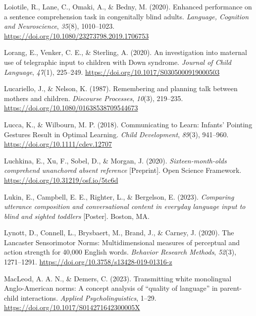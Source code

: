 \documentclass[
  man]{apa6}
\newlength{\cslhangindent}
\newlength{\cslentryspacingunit} %
\newenvironment{CSLReferences}[2] %
 {%
  \setlength{\parindent}{0pt}
  \ifodd #1
  \let\oldpar\par
  \def\par{\hangindent=\cslhangindent\oldpar}
  \fi
  \setlength{\parskip}{#2\cslentryspacingunit}
 }%
 {}
\begin{document}
\begin{CSLReferences}{1}{0}
\leavevmode{}%
Loiotile, R., Lane, C., Omaki, A., \& Bedny, M. (2020). Enhanced performance on a sentence comprehension task in congenitally blind adults. \emph{Language, Cognition and Neuroscience}, \emph{35}(8), 1010--1023. \url{https://doi.org/10.1080/23273798.2019.1706753}

\leavevmode{}%
Lorang, E., Venker, C. E., \& Sterling, A. (2020). An investigation into maternal use of telegraphic input to children with {Down} syndrome. \emph{Journal of Child Language}, \emph{47}(1), 225--249. \url{https://doi.org/10.1017/S0305000919000503}

\leavevmode{}%
Lucariello, J., \& Nelson, K. (1987). Remembering and planning talk between mothers and children. \emph{Discourse Processes}, \emph{10}(3), 219--235. \url{https://doi.org/10.1080/01638538709544673}

\leavevmode{}%
Lucca, K., \& Wilbourn, M. P. (2018). Communicating to {Learn}: {Infants}' {Pointing Gestures Result} in {Optimal Learning}. \emph{Child Development}, \emph{89}(3), 941--960. \url{https://doi.org/10.1111/cdev.12707}

\leavevmode{}%
Luchkina, E., Xu, F., Sobel, D., \& Morgan, J. (2020). \emph{Sixteen-month-olds comprehend unanchored absent reference} {[}Preprint{]}. Open Science Framework. \url{https://doi.org/10.31219/osf.io/5tc6d}

\leavevmode{}%
Lukin, E., Campbell, E. E., Righter, L., \& Bergelson, E. (2023). \emph{Comparing utterance composition and conversational content in everyday language input to blind and sighted toddlers} {[}Poster{]}. Boston, MA.

\leavevmode{}%
Lynott, D., Connell, L., Brysbaert, M., Brand, J., \& Carney, J. (2020). The {Lancaster Sensorimotor Norms}: Multidimensional measures of perceptual and action strength for 40,000 {English} words. \emph{Behavior Research Methods}, \emph{52}(3), 1271--1291. \url{https://doi.org/10.3758/s13428-019-01316-z}

\leavevmode{}%
MacLeod, A. A. N., \& Demers, C. (2023). Transmitting white monolingual {Anglo-American} norms: {A} concept analysis of {``quality of language''} in parent-child interactions. \emph{Applied Psycholinguistics}, 1--29. \url{https://doi.org/10.1017/S014271642300005X}


\end{CSLReferences}
\end{document}

